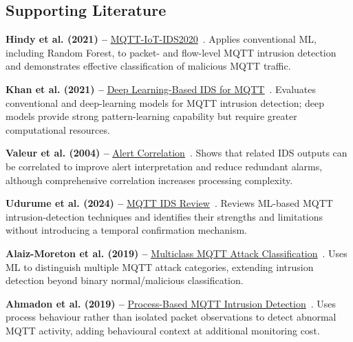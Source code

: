 \documentclass[conference]{IEEEtran}
\newcommand{\bluelink}[2]{\textcolor{blue}{\uline{\href{#1}{#2}}}}
\newcommand{\safeSubsection}[1]{\Needspace{5\baselineskip}\subsection{#1}}
\begin{document}

\safeSubsection{Supporting Literature}

\sloppy

\noindent
\textbf{Hindy et al. (2021) -- }
\bluelink{https://arxiv.org/abs/2006.15340}
{MQTT-IoT-IDS2020}~\cite{hindy2021}.
Applies conventional ML, including Random Forest, to packet- and
flow-level MQTT intrusion detection and demonstrates effective
classification of malicious MQTT traffic.

\medskip

\noindent
\textbf{Khan et al. (2021) -- }
\bluelink{https://www.mdpi.com/1424-8220/21/21/7016}
{Deep Learning-Based IDS for MQTT}~\cite{khan2021}.
Evaluates conventional and deep-learning models for MQTT intrusion
detection; deep models provide strong pattern-learning capability but
require greater computational resources.

\medskip

\noindent
\textbf{Valeur et al. (2004) -- }
\bluelink{https://escholarship.org/uc/item/3r33v62n}
{Alert Correlation}~\cite{valeur2004}.
Shows that related IDS outputs can be correlated to improve alert
interpretation and reduce redundant alarms, although comprehensive
correlation increases processing complexity.

\medskip

\noindent
\textbf{Udurume et al. (2024) -- }
\bluelink{https://doi.org/10.1109/ICTC62082.2024.10826657}
{MQTT IDS Review}~\cite{udurume2024}.
Reviews ML-based MQTT intrusion-detection techniques and identifies
their strengths and limitations without introducing a temporal
confirmation mechanism.

\medskip

\noindent
\textbf{Alaiz-Moreton et al. (2019) -- }
\bluelink{https://onlinelibrary.wiley.com/doi/10.1155/2019/6516253}
{Multiclass MQTT Attack Classification}~\cite{alaiz2019}.
Uses ML to distinguish multiple MQTT attack categories, extending
intrusion detection beyond binary normal/malicious classification.

\medskip

\noindent
\textbf{Ahmadon et al. (2019) -- }
\bluelink{https://doi.org/10.1109/GCCE46687.2019.9015331}
{Process-Based MQTT Intrusion Detection}~\cite{ahmadon2019}.
Uses process behaviour rather than isolated packet observations to
detect abnormal MQTT activity, adding behavioural context at additional
monitoring cost.
\end{document}
